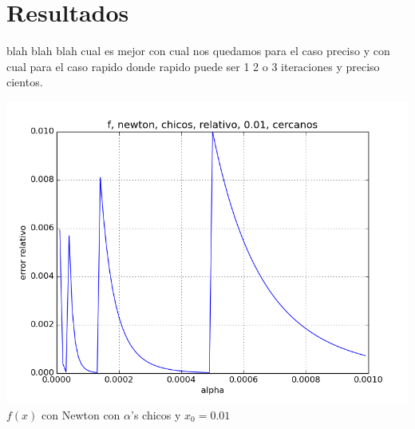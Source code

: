 \section{Resultados}

blah blah blah cual es mejor con cual nos quedamos para el caso preciso y con
cual para el caso rapido donde rapido puede ser 1 2 o 3 iteraciones y preciso
cientos.

\begin{center}
\includegraphics[scale=0.5]{../codigo/resultados/relativo-f-newton-chicos-relativo-0.01-cercanos.png}\\
$f(x)$ con Newton con $\alpha$'s chicos y $x_0 = 0.01$
\end{center}




